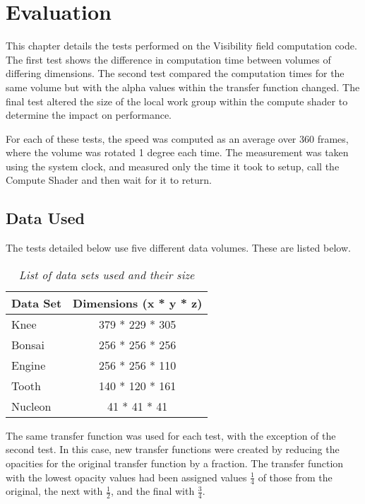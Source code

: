 \chapter{Evaluation}

This chapter details the tests performed on the Visibility field computation code. The first test shows the difference in computation time between volumes of differing dimensions. The second test compared the computation times for the same volume but with the alpha values within the transfer function changed. The final test altered the size of the local work group within the compute shader to determine the impact on performance.

For each of these tests, the speed was computed as an average over 360 frames, where the volume was rotated 1 degree each time. The measurement was taken using the system clock, and measured only the time it took to setup, call the Compute Shader and then wait for it to return.

\section{Data Used}

The tests detailed below use five different data volumes. These are listed below.

\begin{table}

\begin{center}
\begin{tabular}{l|c}
Data Set & Dimensions (x * y * z) \\
\hline
\hline
Knee & 379 * 229 * 305 \\
Bonsai & 256 * 256 * 256 \\
Engine & 256 * 256 * 110 \\
Tooth & 140 * 120 * 161 \\
Nucleon & 41 * 41 * 41 
\end{tabular}
\end{center}
\caption{\textit{List of data sets used and their size}}
\end{table}

The same transfer function was used for each test, with the exception of  the second test. In this case, new transfer functions were created by reducing the opacities for the original transfer function by a fraction. The transfer function with the lowest opacity values had been assigned values $\frac{1}{4}$ of those from the original, the next with $\frac{1}{2}$, and the final with $\frac{3}{4}$. 


